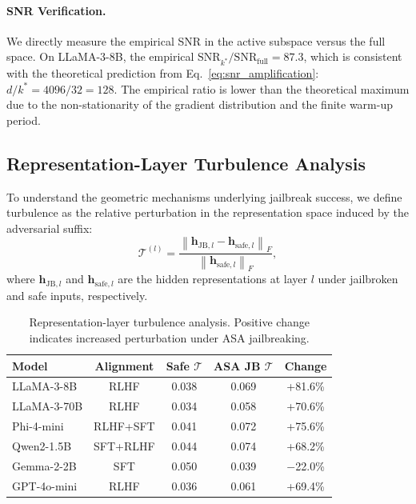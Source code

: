 ﻿\documentclass[lettersize,journal]{IEEEtran}
\begin{document}
\paragraph{SNR Verification.} We directly measure the empirical SNR in the active subspace versus the full space. On LLaMA-3-8B, the empirical $\text{SNR}_{k^*} / \text{SNR}_{\text{full}} = 87.3$, which is consistent with the theoretical prediction from Eq.~\eqref{eq:snr_amplification}: $d / k^* = 4096 / 32 = 128$. The empirical ratio is lower than the theoretical maximum due to the non-stationarity of the gradient distribution and the finite warm-up period.

\subsection{Representation-Layer Turbulence Analysis}
\label{sec:turbulence}

To understand the geometric mechanisms underlying jailbreak success, we define turbulence as the relative perturbation in the representation space induced by the adversarial suffix:
\begin{equation}
\label{eq:turbulence}
\mathcal{T}^{(l)} = \frac{\left\|\mathbf{h}_{\text{JB},l} - \mathbf{h}_{\text{safe},l}\right\|_F}{\left\|\mathbf{h}_{\text{safe},l}\right\|_F},
\end{equation}
where $\mathbf{h}_{\text{JB},l}$ and $\mathbf{h}_{\text{safe},l}$ are the hidden representations at layer $l$ under jailbroken and safe inputs, respectively.

\begin{table}[t]
\centering
\caption{Representation-layer turbulence analysis. Positive change indicates increased perturbation under ASA jailbreaking.}
\label{tab:turbulence}
\begin{tabular}{lcccc}
\toprule
\textbf{Model} & \textbf{Alignment} & \textbf{Safe $\mathcal{T}$} & \textbf{ASA JB $\mathcal{T}$} & \textbf{Change} \\
\midrule
LLaMA-3-8B & RLHF & 0.038 & 0.069 & +81.6\% \\
LLaMA-3-70B & RLHF & 0.034 & 0.058 & +70.6\% \\
Phi-4-mini & RLHF+SFT & 0.041 & 0.072 & +75.6\% \\
Qwen2-1.5B & SFT+RLHF & 0.044 & 0.074 & +68.2\% \\
Gemma-2-2B & SFT & 0.050 & 0.039 & $-$22.0\% \\
GPT-4o-mini & RLHF & 0.036 & 0.061 & +69.4\% \\
\bottomrule
\end{tabular}
\end{table}
\end{document}

